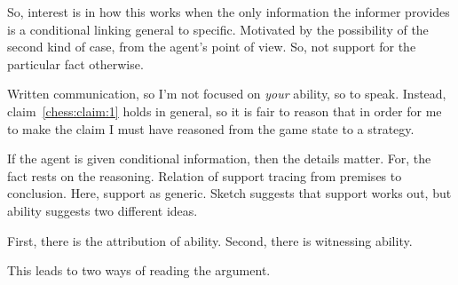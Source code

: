 \documentclass[10pt]{article}
\newcommand{\hozlinedash}[0]{%
  \noindent\hdashrule[0.5ex][c]{\textwidth}{.1pt}{2.5pt}
}
\begin{document}
So, interest is in how this works when the only information the informer provides is a conditional linking general to specific.
Motivated by the possibility of the second kind of case, from the agent's point of view.
So, not support for the particular fact otherwise.

\begin{note}
Written communication, so I'm not focused on \emph{your} ability, so to speak.
Instead, claim~\ref{chess:claim:1} holds in general, so it is fair to reason that in order for me to make the claim I must have reasoned from the game state to a strategy.
\end{note}

\hozlinedash

\begin{note}
  If the agent is given conditional information, then the details matter.
  For, the fact rests on the reasoning.
  Relation of support tracing from premises to conclusion.
  Here, support as generic.
  Sketch suggests that support works out, but ability suggests two different ideas.
\end{note}

\begin{note}
  First, there is the attribution of ability.
  Second, there is witnessing ability.

  This leads to two ways of reading the argument.
\end{note}
\end{document}
